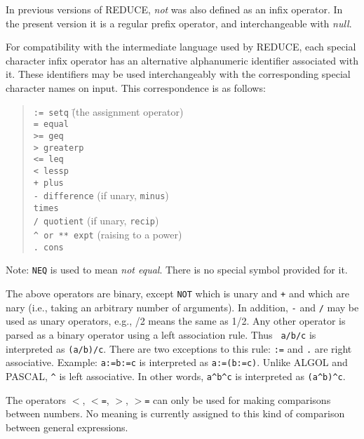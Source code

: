 \documentclass[11pt,letterpaper]{book}
\newcommand{\REDUCE}{REDUCE}
\begin{document}
In previous versions of {\REDUCE}, {\em not} was also defined as an infix
operator.  In the present version it is a regular prefix operator, and
interchangeable with {\em null}.

For compatibility with the intermediate language used by {\REDUCE}, each
special character infix operator has an alternative
alphanumeric identifier associated with it.  These identifiers may be used
interchangeably with the corresponding special character names on input.
This correspondence is as follows:
\begin{quote}
\begin{tabbing}
{\tt :=      setq} \hspace{0.5in} \= (the assignment operator) \\
{\tt =       equal} \\
{\tt >=      geq} \\
{\tt >       greaterp} \\
{\tt <=      leq} \\
{\tt <       lessp} \\
{\tt +       plus} \\
{\tt -       difference} \> (if unary, {\tt minus}) \\
{\tt *       times} \\
{\tt /       quotient} \> (if unary, {\tt recip}) \\
{\tt \verb|^| or ** expt} \> (raising to a power) \\
{\tt .       cons}
\end{tabbing}
\end{quote}
Note: {\tt NEQ} is used to mean {\em not equal}.  There is no special
symbol provided for it.

The above operators are binary, except {\tt NOT} which is
unary and {\tt +} and {\tt *} which are nary (i.e., taking an arbitrary
number of arguments).  In addition, {\tt -} and {\tt /} may be used as
unary operators, e.g., /2 means the same as 1/2.  Any other operator is
parsed as a binary operator using a left association rule.  Thus {\tt
a/b/c} is interpreted as {\tt (a/b)/c}.  There are two exceptions to this
rule: {\tt :=} and {\tt .} are right associative.  Example: {\tt a:=b:=c}
is interpreted as {\tt a:=(b:=c)}.  Unlike ALGOL and PASCAL, {\tt \verb|^|} is
left associative.  In other words, {\tt a\verb|^|b\verb|^|c} is interpreted as
{\tt (a\verb|^|b)\verb|^|c}.

The operators {\tt $<$}, {\tt $<$=}, {\tt $>$}, {\tt $>$=}
can only be used for making comparisons between numbers.  No meaning is
currently assigned to this kind of comparison between general expressions.
\end{document}
